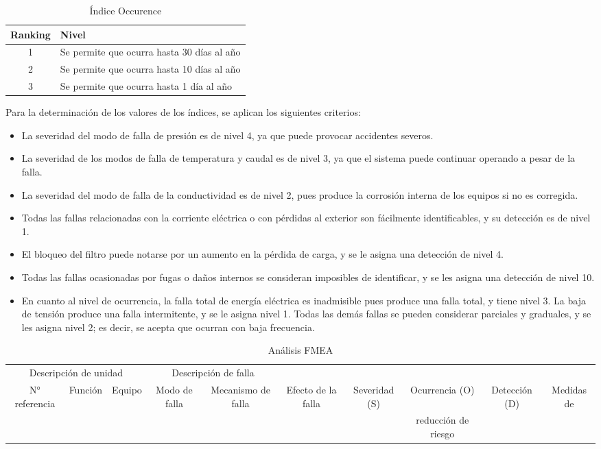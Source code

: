 \documentclass{article}
\begin{document}
\begin{table}[H]
\centering
\begin{tabularx}{\textwidth}{cX}
\toprule
Ranking & Nivel \\
\midrule
1 & Se permite que ocurra hasta 30 días al año \\
2 & Se permite que ocurra hasta 10 días al año \\
3 & Se permite que ocurra hasta 1 día al año \\
\bottomrule
\end{tabularx}
\caption{Índice Occurence}
\end{table}
Para la determinación de los valores de los índices, se aplican los siguientes criterios:
\begin{itemize}
    \item La severidad del modo de falla de presión es de nivel 4, ya que puede provocar accidentes severos.
    \item La severidad de los modos de falla de temperatura y caudal es de nivel 3, ya que el sistema puede continuar operando a pesar de la falla.
    \item La severidad del modo de falla de la conductividad es de nivel 2, pues produce la corrosión interna de los equipos si no es corregida.
    \item Todas las fallas relacionadas con la corriente eléctrica o con pérdidas al exterior son fácilmente identificables, y su detección es de nivel 1.
    \item El bloqueo del filtro puede notarse por un aumento en la pérdida de carga, y se le asigna una detección de nivel 4.
    \item Todas las fallas ocasionadas por fugas o daños internos se consideran imposibles de identificar, y se les asigna una detección de nivel 10.
    \item En cuanto al nivel de ocurrencia, la falla total de energía eléctrica es inadmisible pues produce una falla total, y tiene nivel 3. La baja de tensión produce una falla intermitente, y se le asigna nivel 1. Todas las demás fallas se pueden considerar parciales y graduales, y se les asigna nivel 2; es decir, se acepta que ocurran con baja frecuencia.
\end{itemize}
\begin{landscape}
\begin{table}[H]
\centering
\begin{tabular}{cccccccccc}
\toprule
\multicolumn{3}{c}{Descripción de unidad} & \multicolumn{2}{c}{Descripción de falla} &  &  & & & \\
N° referencia & Función & Equipo & Modo de falla & Mecanismo de falla & Efecto de la falla & Severidad (S) & Ocurrencia (O) & Detección (D) & Medidas de \\
 & & & & & & & reducción de riesgo \\
\bottomrule
\end{tabular}
\caption{Análisis FMEA}
\end{table}
\end{landscape}
\end{document}
